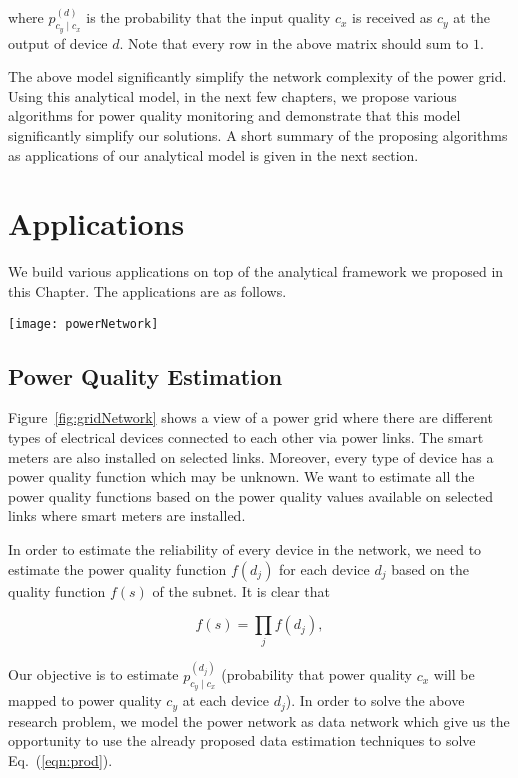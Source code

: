 \noindent
where $p_{c_y \mid c_x}^{(d)}$ is the probability that the input quality $c_x$ is received as $c_y$ at the output of device $d$. Note that every row in the above matrix should sum to $1$. 

The above model significantly simplify the network complexity of the power grid. Using this analytical model, in the next few chapters, we propose various algorithms for power quality monitoring and demonstrate that this model significantly simplify our solutions. A short summary of the proposing algorithms as applications of our analytical model is given in the next section.

\section{Applications}
We build various applications on top of the analytical framework we proposed in this Chapter. The applications are as follows.

\begin{figure*}[!t]
    \centering
    \texttt{[image: powerNetwork]}
    \caption{A simple view of power microgrid}
    \label{fig:gridNetwork}
\end{figure*}


\subsection{Power Quality Estimation}
Figure~\ref{fig:gridNetwork} shows a view of a power grid where there are different types of electrical devices connected to each other via power links. The smart meters are also installed on selected links. Moreover, every type of device has a power quality function which may be unknown. We want to estimate all the power quality functions based on the power quality values available on selected links where smart meters are installed.

In order to estimate the reliability of every device in the network, we need to estimate the power quality function $f(d_j)$ for each device $d_j$ based on the quality function $f(s)$ of the subnet. It is clear that

\begin{equation}
\label{eqn:prod}
f(s) = \prod_{j} f(d_j),
\end{equation}

Our objective is to estimate $p_{c_y \mid c_x}^{(d_j)}$ (probability that power quality $c_x$ will be mapped to power quality $c_y$ at each device $d_j$). In order to solve the above research problem, we model the power network as data network which give us the opportunity to use the already proposed data estimation techniques to solve Eq.~(\ref{eqn:prod}).

